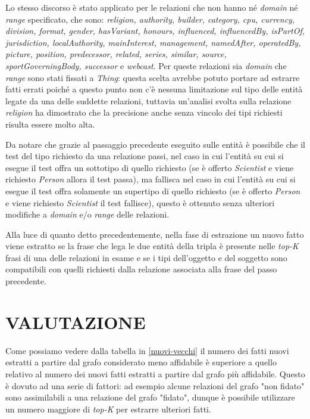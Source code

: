 \documentclass[10pt,a4paper,twocolumn]{article}
\begin{document}
Lo stesso discorso è stato applicato per le relazioni che non hanno né \textit{domain} né \textit{range} specificato, che sono: \textit{religion, authority, builder, category, cpu, currency, division, format, gender, hasVariant, honours, influenced, influencedBy, isPartOf, jurisdiction, localAuthority, mainInterest, management, namedAfter, operatedBy, picture, position, predecessor, related, series, similar, source, sportGoverningBody, successor} e \textit{webcast}. Per queste relazioni sia \textit{domain} che \textit{range} sono stati fissati a \textit{Thing}: questa scelta avrebbe potuto portare ad estrarre fatti errati poiché a questo punto non c'è nessuna limitazione sul tipo delle entità legate da una delle suddette relazioni, tuttavia un'analisi svolta sulla relazione \textit{religion} ha dimostrato che la precisione anche senza vincolo dei tipi richiesti risulta essere molto alta. 

Da notare che grazie al passaggio precedente eseguito sulle entità è possibile che il test del tipo richiesto da una relazione passi, nel caso in cui l'entità su cui si esegue il test offra un sottotipo di quello richiesto (se è offerto \textit{Scientist} e viene richiesto \textit{Person} allora il test passa), ma fallisca nel caso in cui l'entità su cui si esegue il test offra solamente un supertipo di quello richiesto (se è offerto \textit{Person} e viene richiesto \textit{Scientist} il test fallisce), questo è ottenuto senza ulteriori modifiche a \textit{domain} e/o \textit{range} delle relazioni.

Alla luce di quanto detto precedentemente, nella fase di estrazione un nuovo fatto viene estratto se la frase che lega le due entità della tripla è presente nelle \textit{top-K} frasi di una delle relazioni in esame e se i tipi dell'oggetto e del soggetto sono compatibili con quelli richiesti dalla relazione associata alla frase del passo precedente.  


\section{VALUTAZIONE}

Come possiamo vedere dalla tabella in \ref{nuovi-vecchi} il numero dei fatti nuovi estratti a partire dal grafo considerato meno affidabile è superiore a quello relativo al numero dei nuovi fatti estratti a partire dal grafo più affidabile. Questo è dovuto ad una serie di fattori: ad esempio alcune relazioni del grafo "non fidato" sono assimilabili a una relazione del grafo "fidato", dunque è possibile utilizzare un numero maggiore di \textit{top-K} per estrarre ulteriori fatti.
\end{document}
